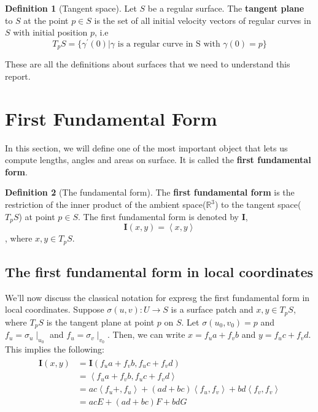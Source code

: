 \documentclass{article}
\theoremstyle{plain}
\theoremstyle{definition}
\newtheorem{definition}{Definition}
\theoremstyle{remark}
\newcommand{\R}{\mathbb{R}}
\begin{document}
\begin{definition}[Tangent space]
    Let \(S\) be a regular surface. The \textbf{tangent plane} to \(S\) at the point \( p \in S\) is the set of all initial velocity vectors of regular curves in \(S\) with initial position \(p\), i.e \[ T_pS = \{ \gamma^\prime(0) | \gamma \text{ is a regular curve in S with }\gamma(0) = p\} \]
\end{definition}

These are all the definitions about surfaces that we need to understand this report.

\section{First Fundamental Form}
In this section, we will define one of the most important object that lets us compute lengths, angles and areas on surface. It is called the \textbf{first fundamental form}.

\begin{definition}[The fundamental form]
    The \textbf{first fundamental form} is the restriction of the inner product of the ambient space(\(\R^3\)) to the tangent space(\( T_pS\)) at point \( p \in S\). The first fundamental form is denoted by \( \mathbf{I} \), \[ \mathbf{I}(x,y) = \left\langle x,y\right\rangle  \], where \( x,y \in T_pS\).
\end{definition}

\subsection{The first fundamental form in local coordinates} \label{ssec: The first fundamental form in local coordinates}
We'll now discuss the classical notation for expresg the first fundamental form in local coordinates. Suppose \( \sigma(u,v): U \rightarrow S\) is a surface patch and \( x,y \in T_pS \), where \(T_pS\) is the tangent plane at point \(p\) on \(S\). Let \( \sigma(u_0, v_0) = p \) and \( f_u = \sigma_u \mid_{u_0} \) and \( f_u = \sigma_v \mid_{v_0} \). Then, we can write \(x =  f_u a + f_v b\) and \( y =  f_u c + f_v d\). This implies the following:
\begin{align}
    \begin{split}
        \mathbf{I}(x,y) & = \mathbf{I}( f_u a + f_v b,  f_u c + f_v d) \\
        & = \left\langle f_u a + f_v b,  f_u c + f_v d \right\rangle \\
        & = ac\left\langle  f_u  +,  f_u  \right\rangle + (ad+bc)\left\langle  f_u  , f_v  \right\rangle + bd \left\langle f_v , f_v  \right\rangle \\
        & = ac E + (ad+bc)F + bd G
    \end{split}
\end{align}
\end{document}
